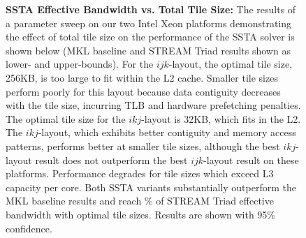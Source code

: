 \documentclass[10pt, conference, compsocconf]{IEEEtran}
\newcommand{\textapprox}{\texttildelow}
\begin{document}
\begin{figure}[!bth]
  \centering
  \caption{
    \textbf{SSTA Effective Bandwidth vs. Total Tile Size:}
    The results of a parameter sweep on our two Intel Xeon platforms
      demonstrating the effect of total tile size on the performance of the
      SSTA solver is shown below (MKL baseline and STREAM Triad results shown as
      lower- and upper-bounds).
    For the \(ijk\)-layout, the optimal tile size, 256KB, is too large to fit
      within the L2 cache.
    Smaller tile sizes perform poorly for this layout because data contiguity
      decreases with the tile size, incurring TLB and hardware prefetching
      penalties.
    The optimal tile size for the \(ikj\)-layout is 32KB, which fits in the L2. 
    The \(ikj\)-layout, which exhibits better contiguity and memory access
      patterns, performs better at smaller tile sizes, although the best
      \(ikj\)-layout result does not outperform the best \(ijk\)-layout result
      on these platforms.
    Performance degrades for tile sizes which exceed L3 capacity per core.
    Both SSTA variants substantially outperform the MKL baseline results and 
      reach \textapprox 90\% of STREAM Triad effective bandwidth with optimal 
      tile sizes.
    Results are shown with 95\% confidence.
  }
  \label{fig:results:bw_vs_tile_size_xeon}
  \begin{minipage}{0.49\textwidth}
  \end{minipage}
  \begin{minipage}{0.49\textwidth}
  \end{minipage}
\end{figure}
\end{document}
